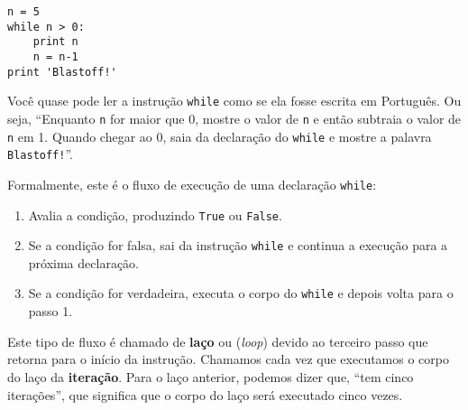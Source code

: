 \beforeverb
\begin{verbatim}
n = 5
while n > 0:
    print n
    n = n-1
print 'Blastoff!'
\end{verbatim}
\afterverb
%

%
Você quase pode ler a instrução {\tt while} como se ela fosse escrita em
Português. Ou seja, ``Enquanto {\tt n} for maior que 0, mostre o valor de {\tt n}
e então subtraia o valor de {\tt n} em 1. Quando chegar ao 0, saia da
declaração do {\tt while} e mostre a palavra {\tt Blastoff!}''.


Formalmente, este é o fluxo de execução de uma declaração {\tt while}:

\begin{enumerate}

\item Avalia a condição, produzindo {\tt True} ou {\tt False}.

\item Se a condição for falsa, sai da instrução {\tt while} e continua
	a execução para a próxima declaração.

\item Se a condição for verdadeira, executa o corpo do {\tt while} e depois
	volta para o passo 1.

\end{enumerate}


Este tipo de fluxo é chamado de {\bf laço} ou ({\it loop}) devido ao terceiro
passo que retorna para o início da instrução. Chamamos cada vez que executamos
o corpo do laço da {\bf iteração}. Para o laço anterior, podemos dizer que,
``tem cinco iterações'', que significa que o corpo do laço será executado
cinco vezes.

